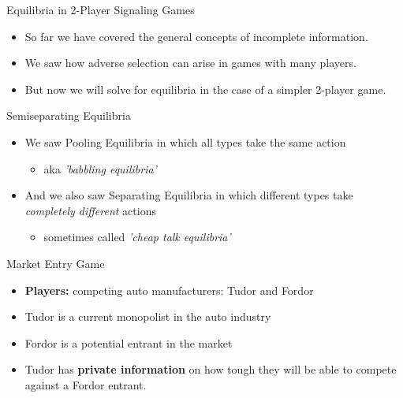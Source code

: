 \begin{frame}{Equilibria in 2-Player Signaling Games}
  \begin{itemize}
    \item So far we have covered the general concepts of incomplete information.
    \item We saw how \alert{adverse selection} can arise 
    in games with many players.
    \item But now we will solve for equilibria 
    in the case of a simpler 2-player game.
  \end{itemize} 
\end{frame}


\begin{frame}{Semiseparating Equilibria}
  \begin{itemize}
    \item We saw \alert{Pooling Equilibria} 
    in which all types take the same action
    \begin{itemize}
      \item aka \textit{'babbling  equilibria'}
    \end{itemize}
    \item And we also saw \alert{Separating Equilibria}
    in which different types take \textit{completely different} actions
    \begin{itemize}
      \item sometimes called \textit{'cheap talk equilibria'} 
    \end{itemize}
  \end{itemize}
\end{frame}


\begin{frame}{Market Entry Game}
  \begin{itemize}
    \item \textbf{Players:} competing auto manufacturers:
    \alert{Tudor} and \alert{Fordor}
    \item \alert{Tudor} is a current monopolist in the auto industry 
    \item \alert{Fordor} is a potential entrant in the market 
    \item \alert{Tudor} has \textbf{private information} 
    on how tough they will be able to compete against a \alert{Fordor} entrant. 
  \end{itemize}
\end{frame}

